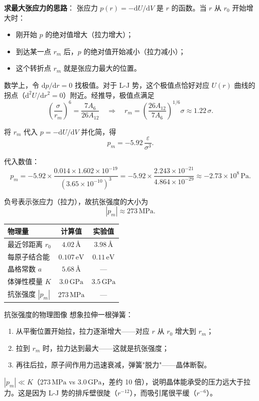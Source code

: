 \textbf{求最大张应力的思路}：
张应力 $p(r) = -\mathrm{d}U/\mathrm{d}V$ 是 $r$ 的函数。当 $r$ 从 $r_0$ 开始增大时：
\begin{itemize}[nosep]
  \item 刚开始 $p$ 的绝对值增大（拉力增大）；
  \item 到达某一点 $r_m$ 后，$p$ 的绝对值开始减小（拉力减小）；
  \item 这个转折点 $r_m$ 就是张应力最大的位置。
\end{itemize}

数学上，令 $\mathrm{d}p/\mathrm{d}r = 0$ 找极值。对于 L-J 势，这个极值点恰好对应 $U(r)$ 曲线的拐点（$\mathrm{d}^2U/\mathrm{d}r^2 = 0$）附近。经推导，极值点满足
\[
  \left(\frac{\sigma}{r_m}\right)^6 = \frac{7A_6}{26A_{12}}
  \quad\Longrightarrow\quad
  r_m = \left(\frac{26A_{12}}{7A_6}\right)^{1/6}\sigma
      \approx 1.22\,\sigma .
\]

将 $r_m$ 代入 $p = -\mathrm{d}U/\mathrm{d}V$ 并化简，得
\[
  p_m = -5.92\,\frac{\varepsilon}{\sigma^3} .
\tag{8}
\]

代入数值：
\[
  p_m = -5.92\times\frac{0.014\times 1.602\times 10^{-19}}{(3.65\times 10^{-10})^3}
      = -5.92\times\frac{2.243\times 10^{-21}}{4.864\times 10^{-29}}
      \approx -2.73\times 10^8\,\text{Pa} .
\]

负号表示张应力（拉力），故抗张强度的大小为
\[
  \boxed{|p_m| \approx 273\,\text{MPa}} .
\]

\begin{center}
\renewcommand{\arraystretch}{1.5}
\begin{tabular}{|l|c|c|}
\hline
\textbf{物理量} & \textbf{计算值} & \textbf{实验值} \\
\hline
最近邻距离 $r_0$       & $4.02\,\text{\AA}$  & $3.98\,\text{\AA}$ \\
每原子结合能          & $0.107\,\text{eV}$   & $0.11\,\text{eV}$ \\
晶格常数 $a$          & $5.68\,\text{\AA}$  & --- \\
体弹性模量 $K$         & $3.0\,\text{GPa}$    & $3.5\,\text{GPa}$ \\
抗张强度 $|p_m|$       & $273\,\text{MPa}$   & --- \\
\hline
\end{tabular}
\end{center}

\begin{insightbox}{抗张强度的物理图像}
想象拉伸一根弹簧：
\begin{enumerate}[nosep]
  \item 从平衡位置开始拉，拉力逐渐增大——对应 $r$ 从 $r_0$ 增大到 $r_m$；
  \item 拉到 $r_m$ 时，拉力达到最大——这就是抗张强度；
  \item 再往后拉，原子间作用力迅速衰减，弹簧"脱力"——晶体断裂。
\end{enumerate}

$|p_m| \ll K$（$273\,\text{MPa}$ vs $3.0\,\text{GPa}$，差约 10 倍），说明晶体能承受的压力远大于拉力。这是因为 L-J 势的排斥壁很陡（$r^{-12}$），而吸引尾很平缓（$r^{-6}$）。
\end{insightbox}

